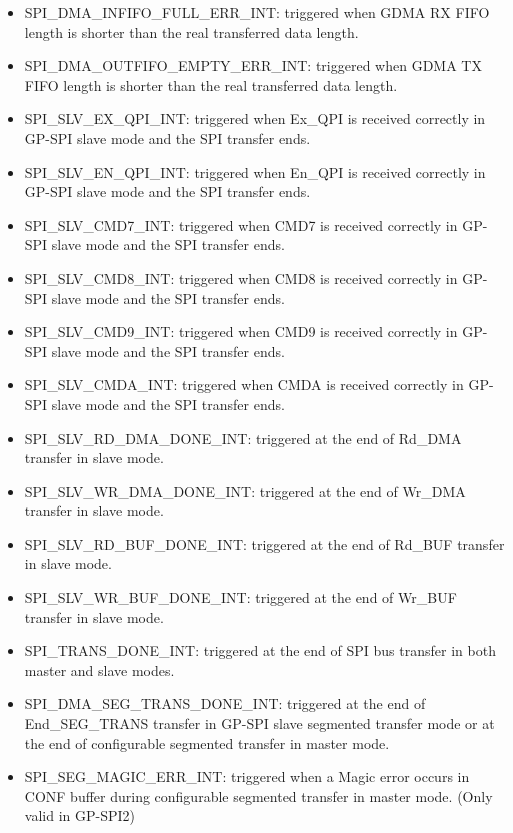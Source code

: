 \documentclass[main\_\_EN.tex]{subfiles}
\begin{document}
\begin{itemize}
\item \label{int:SPIINFIFOFULLERRINT}SPI\_DMA\_INFIFO\_FULL\_ERR\_INT: triggered when GDMA RX FIFO length is shorter than the real transferred data length.
\item \label{int:SPIOUTFIFOEMPTYERRINT}SPI\_DMA\_OUTFIFO\_EMPTY\_ERR\_INT: triggered when GDMA TX FIFO length is shorter than the real transferred data length.

\item \label{int:SPISLVEXQPIINT} SPI\_SLV\_EX\_QPI\_INT: triggered when Ex\_QPI is received correctly in GP-SPI slave mode and the SPI transfer ends.
\item \label{int:SPISLVENQPIINT} SPI\_SLV\_EN\_QPI\_INT: triggered when En\_QPI is received correctly in GP-SPI slave mode and the SPI transfer ends.
\item \label{int:SPISLVCMD7INT} SPI\_SLV\_CMD7\_INT: triggered when CMD7 is received correctly in GP-SPI slave mode and the SPI transfer ends.
\item \label{int:SPISLVCMD8INT} SPI\_SLV\_CMD8\_INT: triggered when CMD8 is received correctly in GP-SPI slave mode and the SPI transfer ends.
\item \label{int:SPISLVCMD9INT} SPI\_SLV\_CMD9\_INT: triggered when CMD9 is received correctly in GP-SPI slave mode and the SPI transfer ends.
\item \label{int:SPISLVCMDAINT} SPI\_SLV\_CMDA\_INT: triggered when CMDA is received correctly in GP-SPI slave mode and the SPI transfer ends.

\item \label{int:SPISLVRDDMADONEINT}SPI\_SLV\_RD\_DMA\_DONE\_INT: triggered at the end of Rd\_DMA transfer in slave mode.
\item \label{int:SPISLVWRDMADONEINT}SPI\_SLV\_WR\_DMA\_DONE\_INT: triggered at the end of Wr\_DMA transfer in slave mode.
\item \label{int:SPISLVRDBUFDONEINT}SPI\_SLV\_RD\_BUF\_DONE\_INT: triggered at the end of Rd\_BUF transfer in slave mode.
\item \label{int:SPISLVWRBUFDONEINT}SPI\_SLV\_WR\_BUF\_DONE\_INT: triggered at the end of Wr\_BUF transfer in slave mode.

\item \label{int:SPITRANSDONEINT}SPI\_TRANS\_DONE\_INT: triggered at the end of SPI bus transfer in both master and slave modes.
\item \label{int:SPIDMASEGTRANSDONEINT}SPI\_DMA\_SEG\_TRANS\_DONE\_INT: triggered at the end of End\_SEG\_TRANS transfer in GP-SPI slave segmented transfer mode or at the end of configurable segmented transfer in master mode.
\item \label{int:SPISEGMAGICERRINT} SPI\_SEG\_MAGIC\_ERR\_INT: triggered when a Magic error occurs in CONF buffer during configurable segmented transfer in master mode. (Only valid in GP-SPI2)



\end{itemize}
\end{document}
